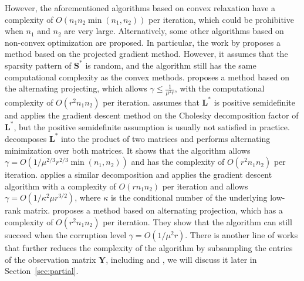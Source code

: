 \documentclass[12pt]{article}
\newcommand{\bL}{\boldsymbol{L}}
\def\bS{\boldsymbol{S}}
\def\bY{\boldsymbol{Y}}
\theoremstyle{plain}
\theoremstyle{definition}
\theoremstyle{plain}
\theoremstyle{plain}
\theoremstyle{remark}
\begin{document}
 
However, the aforementioned algorithms based on convex relaxation have a complexity of $O(n_1n_2\min(n_1,n_2))$ per iteration, which could be prohibitive when $n_1$ and $n_2$ are very large. Alternatively, some other algorithms based on non-convex optimization are proposed. In particular, the work by \cite{6319655} proposes a method based on the projected gradient method. However, it assumes that the sparsity pattern of $\bS^*$ is random, and the algorithm still has the same computational complexity as the convex methods. \cite{NIPS2014_5430} proposes a method based on the alternating projecting, which allows $\gamma\leq \frac{1}{\mu^2 r}$, with the computational complexity of $O(r^2n_1n_2)$ per iteration. \cite{ChenWainwright2015} assumes that $\bL^*$ is positive semidefinite and applies the gradient descent method on the Cholesky decomposition factor of $\bL^*$, but the positive semidefinite assumption is usually not satisfied in practice. \cite{conf/aistats/GuWL16} decomposes $\bL^*$ into the product of two matrices and performs alternating minimization over both matrices. It shows that the algorithm allows $\gamma=O(1/\mu^{2/3}r^{2/3}\min(n_1,n_2))$ and has the complexity of $O(r^2n_1n_2)$ per iteration. \cite{DBLP:conf/nips/YiPCC16} applies a similar decomposition and applies the gradient descent algorithm with a complexity of $O(rn_1n_2)$ per iteration and allows $\gamma=O(1/\kappa^2\mu r^{3/2})$, where $\kappa$ is the conditional number of the underlying low-rank matrix.  \cite{NIPS2014_5430} proposes a method based on alternating projection, which has a complexity of $O(r^2n_1n_2)$ per iteration. They show that the algorithm can still succeed when the corruption level $\gamma=O(1/\mu^2 r)$. There is another line of works that further reduces the complexity of the algorithm by subsampling the entries of the observation matrix $\bY$, including \cite{NIPS2011_4486,7035075,7809181,DBLP:journals/corr/CherapanamjeriG16} and \cite[Algorithm 2]{DBLP:conf/nips/YiPCC16}, we will discuss it later in Section~\ref{sec:partial}. 
\end{document}

